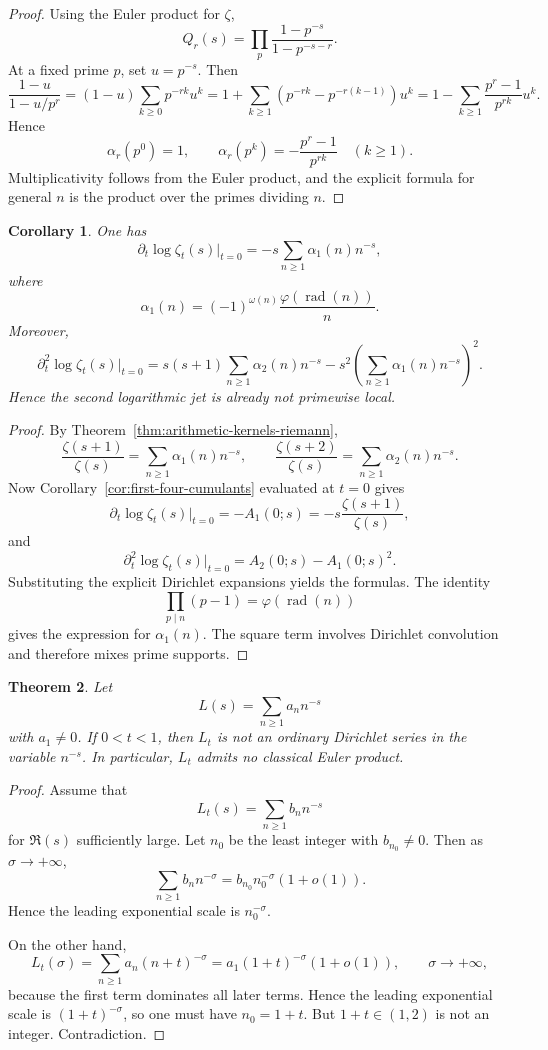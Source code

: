\documentclass[11pt]{amsart}
\numberwithin{equation}{section}
\newtheorem{theorem}{Theorem}[section]
\newtheorem{corollary}[theorem]{Corollary}
\theoremstyle{definition}
\newcommand{\rad}{\operatorname{rad}}
\begin{document}
\begin{proof}
Using the Euler product for $\zeta$,
\[
Q_r(s)=\prod_p\frac{1-p^{-s}}{1-p^{-s-r}}.
\]
At a fixed prime $p$, set $u=p^{-s}$. Then
\[
\frac{1-u}{1-u/p^r}
=
(1-u)\sum_{k\ge0}p^{-rk}u^k
=
1+\sum_{k\ge1}(p^{-rk}-p^{-r(k-1)})u^k
=
1-\sum_{k\ge1}\frac{p^r-1}{p^{rk}}u^k.
\]
Hence
\[
\alpha_r(p^0)=1,
\qquad
\alpha_r(p^k)=-\frac{p^r-1}{p^{rk}}
\quad(k\ge1).
\]
Multiplicativity follows from the Euler product, and the explicit formula for general $n$ is the product over the primes dividing $n$. 
\end{proof}

\begin{corollary}\label{cor:first-log-jet-explicit}
One has
\[
\partial_t\log\zeta_t(s)\Big|_{t=0}
=
-s\sum_{n\ge1}\alpha_1(n)n^{-s},
\]
where
\[
\alpha_1(n)=(-1)^{\omega(n)}\frac{\varphi(\rad(n))}{n}.
\]
Moreover,
\[
\partial_t^2\log\zeta_t(s)\Big|_{t=0}
=
s(s+1)\sum_{n\ge1}\alpha_2(n)n^{-s}
-
s^2\left(\sum_{n\ge1}\alpha_1(n)n^{-s}\right)^2.
\]
Hence the second logarithmic jet is already not primewise local.
\end{corollary}

\begin{proof}
By Theorem~\ref{thm:arithmetic-kernels-riemann},
\[
\frac{\zeta(s+1)}{\zeta(s)}=\sum_{n\ge1}\alpha_1(n)n^{-s},
\qquad
\frac{\zeta(s+2)}{\zeta(s)}=\sum_{n\ge1}\alpha_2(n)n^{-s}.
\]
Now Corollary~\ref{cor:first-four-cumulants} evaluated at $t=0$ gives
\[
\partial_t\log\zeta_t(s)\Big|_{t=0}=-A_1(0;s)=-s\frac{\zeta(s+1)}{\zeta(s)},
\]
and
\[
\partial_t^2\log\zeta_t(s)\Big|_{t=0}=A_2(0;s)-A_1(0;s)^2.
\]
Substituting the explicit Dirichlet expansions yields the formulas. The identity
\[
\prod_{p\mid n}(p-1)=\varphi(\rad(n))
\]
gives the expression for $\alpha_1(n)$. The square term involves Dirichlet convolution and therefore mixes prime supports. 
\end{proof}

\begin{theorem}\label{thm:non-eulerian-nonintegral-t}
Let
\[
L(s)=\sum_{n\ge1}a_n n^{-s}
\]
with $a_1\neq0$. If $0<t<1$, then $L_t$ is not an ordinary Dirichlet series in the variable $n^{-s}$. In particular, $L_t$ admits no classical Euler product.
\end{theorem}

\begin{proof}
Assume that
\[
L_t(s)=\sum_{n\ge1}b_n n^{-s}
\]
for $\Re(s)$ sufficiently large. Let $n_0$ be the least integer with $b_{n_0}\neq0$. Then as $\sigma\to+\infty$,
\[
\sum_{n\ge1}b_n n^{-\sigma}=b_{n_0}n_0^{-\sigma}(1+o(1)).
\]
Hence the leading exponential scale is $n_0^{-\sigma}$.

On the other hand,
\[
L_t(\sigma)=\sum_{n\ge1}a_n(n+t)^{-\sigma}=a_1(1+t)^{-\sigma}(1+o(1)),
\qquad \sigma\to+\infty,
\]
because the first term dominates all later terms. Hence the leading exponential scale is $(1+t)^{-\sigma}$, so one must have $n_0=1+t$. But $1+t\in(1,2)$ is not an integer. Contradiction. 
\end{proof}
\end{document}
